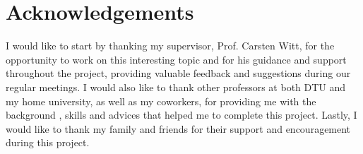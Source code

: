 \section*{Acknowledgements}

I would like to start by thanking my supervisor, Prof. Carsten Witt, for the opportunity to work on this interesting topic and for his guidance and support throughout the project, providing
valuable feedback and suggestions during our regular meetings. I would also like to thank other professors at both DTU and my home university, as well as my coworkers, for providing me with
the background , skills and advices that helped me to complete this project. Lastly, I would like to thank my family and friends for their support and encouragement during this project.
